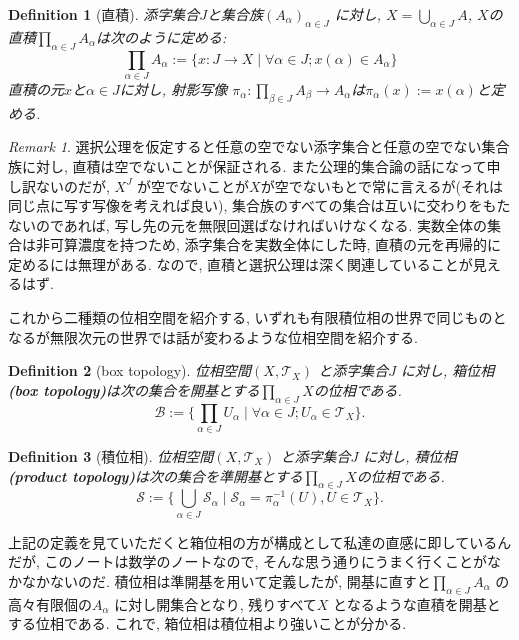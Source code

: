 \documentclass[dvipdfmx]{jbook}
\newtheorem{definition}{Definition}[section]
\theoremstyle{remark}
\newtheorem{remark}{Remark}[section]
\theoremstyle{plain}
\begin{document}
\begin{definition}[直積]
	添字集合$J$と集合族$\left( A_{\alpha} \right) _{\alpha \in J}$ に対し,  $X=\bigcup_{\alpha \in J} A$, $X$の直積$\prod_{\alpha \in J}A_{\alpha}$は次のように定める:
	 \[
	\prod_{\alpha \in J}A_{\alpha} :=\{x:J\to X \mid \forall \alpha \in J; x(\alpha) \in A_{\alpha} \} 
	\] 
	直積の元$x$と$\alpha \in J$に対し, 射影写像 $\pi_{\alpha} : \prod_{\beta \in J}A_{\beta} \to A_{\alpha}$は$\pi_{\alpha}(x):= x(\alpha)$と定める.
\end{definition}

\begin{remark}
選択公理を仮定すると任意の空でない添字集合と任意の空でない集合族に対し, 直積は空でないことが保証される. また公理的集合論の話になって申し訳ないのだが, $X^J$ が空でないことが$X$が空でないもとで常に言えるが(それは同じ点に写す写像を考えれば良い), 集合族のすべての集合は互いに交わりをもたないのであれば, 写し先の元を無限回選ばなければいけなくなる. 実数全体の集合は非可算濃度を持つため, 添字集合を実数全体にした時, 直積の元を再帰的に定めるには無理がある. なので, 直積と選択公理は深く関連していることが見えるはず.
\end{remark}

これから二種類の位相空間を紹介する, いずれも有限積位相の世界で同じものとなるが無限次元の世界では話が変わるような位相空間を紹介する.

\begin{definition}[box topology]
	位相空間$\left( X,\mathcal{T}_X \right) $ と添字集合$J$ に対し, 箱位相 \textbf{(box topology)}は次の集合を開基とする$\prod_{\alpha \in J}X$の位相である. 
	 \[
	\mathcal{B}:=\{\prod_{\alpha \in J}U_{\alpha}  \mid \forall \alpha \in J; U_{\alpha} \in \mathcal{T}_X\} 
	.\] 
\end{definition}

\begin{definition}[積位相]
	位相空間$\left( X,\mathcal{T}_X \right) $ と添字集合$J$ に対し, 積位相 \textbf{(product topology)}は次の集合を準開基とする$\prod_{\alpha \in J}X$の位相である. 
	\[
	\mathcal{S}:=\{\bigcup_{\alpha \in J}\mathcal{S}_{\alpha} \mid \mathcal{S}_{\alpha}= \pi_{\alpha}^{-1} \left( U \right)  , U \in \mathcal{T}_X \} 
	.\] 
\end{definition}

上記の定義を見ていただくと箱位相の方が構成として私達の直感に即しているんだが, このノートは数学のノートなので, そんな思う通りにうまく行くことがなかなかないのだ.
積位相は準開基を用いて定義したが, 開基に直すと$\prod_{\alpha \in J} A_{\alpha}  $ の高々有限個の$A_{\alpha}$ に対し開集合となり, 残りすべて$X$ となるような直積を開基とする位相である. 
これで, 箱位相は積位相より強いことが分かる. 
\end{document}
